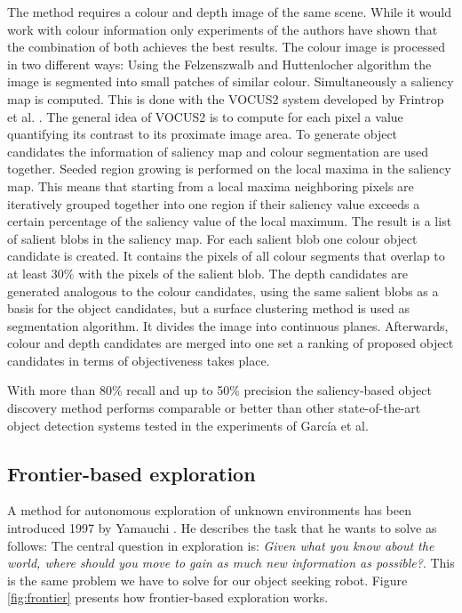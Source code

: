\documentclass[a4paper,11pt,english]{article}
\begin{document}
The method requires a colour and depth image of the same scene.
While it would work with colour information only experiments of the authors have shown that the combination of both achieves the best results.
The colour image is processed in two different ways: 
Using the Felzenszwalb and Huttenlocher algorithm \cite{felzenszwalb2004efficient} the image is segmented into small patches of similar colour.
Simultaneously a saliency map is computed. This is done with the VOCUS2 system developed by Frintrop et al. \cite{frintrop2015traditional}.
The general idea of VOCUS2 is to compute for each pixel a value quantifying its contrast to its proximate image area.
To generate object candidates the information of saliency map and colour segmentation are used together.
Seeded region growing is performed on the local maxima in the saliency map.
This means that starting from a local maxima neighboring pixels are iteratively grouped together into one region if their saliency value exceeds a certain percentage of the saliency value of the local maximum.
The result is a list of salient blobs in the saliency map.
For each salient blob one colour object candidate is created. It contains the pixels of all colour segments that overlap to at least $30\%$ with the pixels of the salient blob.
The depth candidates are generated analogous to the colour candidates, using the same salient blobs as a basis for the object candidates, but a surface clustering method is used as segmentation algorithm. It divides the image into continuous planes.
Afterwards, colour and depth candidates are merged into one set a ranking of proposed object candidates in terms of \glqq{}objectiveness\grqq{} takes place.

With more than 80\% recall and up to 50\% precision the saliency-based object discovery method performs comparable or better than other state-of-the-art object detection systems tested in the experiments of García et al.

\subsection{Frontier-based exploration}
\label{Theoretical_background:Frontier-based_exploration}
A method for autonomous exploration of unknown  environments has been introduced 1997 by Yamauchi \cite{yamauchi1997frontier}.
He describes the task that he wants to solve as follows: \glqq{}The central question in exploration is: \textit{Given what you know about the world, where should you move to gain as much  new  information  as  possible?}\grqq{}.
This is the same problem we have to solve for our object seeking robot.
Figure \ref{fig:frontier} presents how frontier-based exploration works.
\end{document}
